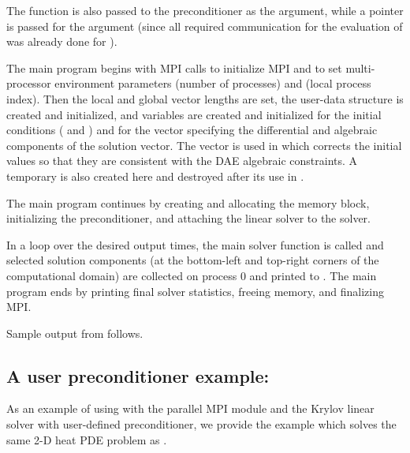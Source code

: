 The function  is also passed to the {\idabbdpre} preconditioner
as the  argument, while a  pointer is passed for the 
argument (since all required communication for the evaluation of  was
already done for ).

The main program begins with MPI calls to initialize MPI and to set
multi-processor environment parameters  (number of processes) and
 (local process index).  Then the local and global vector lengths
are set, the user-data structure  is created and initialized, and
 variables are created and initialized for the initial conditions
( and ) and for the vector  specifying the differential 
and algebraic components of the solution vector. The  vector is used
in  which corrects the initial values so that they are
consistent with the DAE algebraic constraints.
A temporary   is also created here and destroyed after
its use in .

The main program continues by creating and allocating the {\ida} memory
block, initializing the {\idabbdpre} preconditioner, and attaching the
{\idaspgmr} linear solver to the {\ida} solver.

In a loop over the desired output times, the main solver function 
is called and selected solution components (at the bottom-left and top-right
corners of the computational domain) are collected on process 0 and printed
to . The main program ends by printing final solver statistics,
freeing memory, and finalizing MPI.

Sample output from  follows.
\vspace{0.1in}


\subsection{A user preconditioner example: }\label{ss:iheatpk}

As an example of using {\ida} with the parallel MPI {\nvecp} module and the Krylov 
linear solver {\idaspgmr} with user-defined preconditioner, we provide the example
 which solves the same 2-D heat PDE problem as . 


